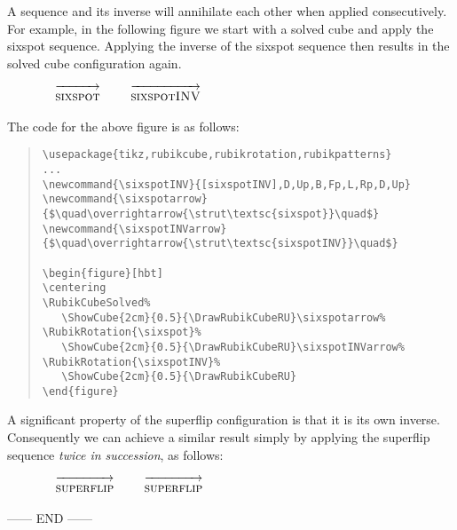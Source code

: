 \documentclass[a4paper]{article}
\begin{document}
\bigskip

A sequence and its inverse will annihilate each other when applied consecutively.  
For example, in the following figure we start with a solved cube and 
apply the sixspot sequence. Applying the  inverse of the sixspot sequence then 
results in the solved cube configuration again.

\newcommand{\sixspotINV}{[sixspotINV],D,Up,B,Fp,L,Rp,D,Up}
\newcommand{\sixspotarrow}{$\quad\overrightarrow{\strut\textsc{sixspot}}\quad$}
\newcommand{\sixspotINVarrow}{$\quad\overrightarrow{\strut\textsc{sixspotINV}}\quad$}

\begin{figure}[hbt]
\centering
\RubikCubeSolved%
   \sixspotarrow%
\RubikRotation{\sixspot}%
   \sixspotINVarrow%
\RubikRotation{\sixspotINV}%
\end{figure}

{\noindent}The code for the above figure is as follows:

\begin{quote}
\begin{verbatim}
\usepackage{tikz,rubikcube,rubikrotation,rubikpatterns}
...
\newcommand{\sixspotINV}{[sixspotINV],D,Up,B,Fp,L,Rp,D,Up}
\newcommand{\sixspotarrow}{$\quad\overrightarrow{\strut\textsc{sixspot}}\quad$}
\newcommand{\sixspotINVarrow}{$\quad\overrightarrow{\strut\textsc{sixspotINV}}\quad$}

\begin{figure}[hbt]
\centering
\RubikCubeSolved%  
   \ShowCube{2cm}{0.5}{\DrawRubikCubeRU}\sixspotarrow% 
\RubikRotation{\sixspot}%   
   \ShowCube{2cm}{0.5}{\DrawRubikCubeRU}\sixspotINVarrow%
\RubikRotation{\sixspotINV}%  
   \ShowCube{2cm}{0.5}{\DrawRubikCubeRU}
\end{figure}
\end{verbatim}
\end{quote}

\pagebreak

A significant property of the superflip configuration is that it is its own inverse.
Consequently we can achieve  a similar result simply by applying the 
superflip sequence \textit{twice in succession}, as follows:

\newcommand{\superfliparrow}{$\quad\overrightarrow{\strut\textsc{superflip}}\quad$}


\begin{figure}[hbt]
\centering
\RubikCubeSolved%
   \superfliparrow%
\RubikRotation{\superflip}%
   \superfliparrow%
\RubikRotation{\superflip}%
\end{figure}




\begin{center}
------ END ------
\end{center}
\end{document}
